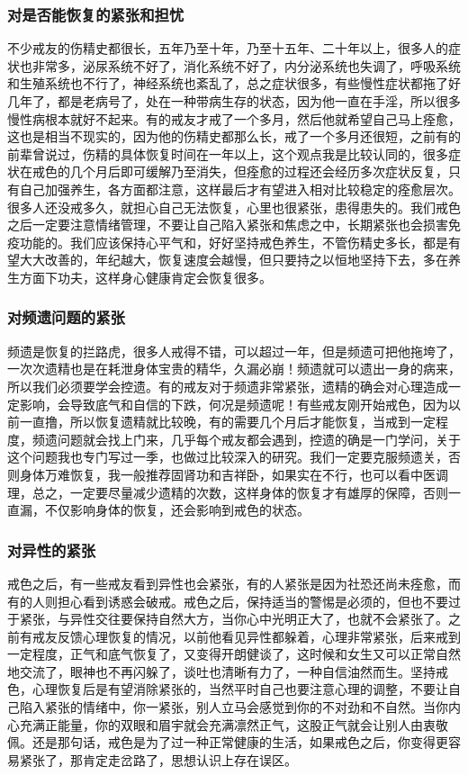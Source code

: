 \subsubsection{对是否能恢复的紧张和担忧}

不少戒友的伤精史都很长，五年乃至十年，乃至十五年、二十年以上，很多人的症状也非常多，泌尿系统不好了，消化系统不好了，内分泌系统也失调了，呼吸系统和生殖系统也不行了，神经系统也紊乱了，总之症状很多，有些慢性症状都拖了好几年了，都是老病号了，处在一种带病生存的状态，因为他一直在手淫，所以很多慢性病根本就好不起来。有的戒友才戒了一个多月，然后他就希望自己马上痊愈，这也是相当不现实的，因为他的伤精史都那么长，戒了一个多月还很短，之前有的前辈曾说过，伤精的具体恢复时间在一年以上，这个观点我是比较认同的，很多症状在戒色的几个月后即可缓解乃至消失，但痊愈的过程还会经历多次症状反复，只有自己加强养生，各方面都注意，这样最后才有望进入相对比较稳定的痊愈层次。很多人还没戒多久，就担心自己无法恢复，心里也很紧张，患得患失的。我们戒色之后一定要注意情绪管理，不要让自己陷入紧张和焦虑之中，长期紧张也会损害免疫功能的。我们应该保持心平气和，好好坚持戒色养生，不管伤精史多长，都是有望大大改善的，年纪越大，恢复速度会越慢，但只要持之以恒地坚持下去，多在养生方面下功夫，这样身心健康肯定会恢复很多。

\subsubsection{对频遗问题的紧张}

频遗是恢复的拦路虎，很多人戒得不错，可以超过一年，但是频遗可把他拖垮了，一次次遗精也是在耗泄身体宝贵的精华，久漏必崩！频遗就可以遗出一身的病来，所以我们必须要学会控遗。有的戒友对于频遗非常紧张，遗精的确会对心理造成一定影响，会导致底气和自信的下跌，何况是频遗呢！有些戒友刚开始戒色，因为以前一直撸，所以恢复遗精就比较晚，有的需要几个月后才能恢复，当戒到一定程度，频遗问题就会找上门来，几乎每个戒友都会遇到，控遗的确是一门学问，关于这个问题我也专门写过一季，也做过比较深入的研究。我们一定要克服频遗关，否则身体万难恢复，我一般推荐固肾功和吉祥卧，如果实在不行，也可以看中医调理，总之，一定要尽量减少遗精的次数，这样身体的恢复才有雄厚的保障，否则一直漏，不仅影响身体的恢复，还会影响到戒色的状态。

\subsubsection{对异性的紧张}

戒色之后，有一些戒友看到异性也会紧张，有的人紧张是因为社恐还尚未痊愈，而有的人则担心看到诱惑会破戒。戒色之后，保持适当的警惕是必须的，但也不要过于紧张，与异性交往要保持自然大方，当你心中光明正大了，也就不会紧张了。之前有戒友反馈心理恢复的情况，以前他看见异性都躲着，心理非常紧张，后来戒到一定程度，正气和底气恢复了，又变得开朗健谈了，这时候和女生又可以正常自然地交流了，眼神也不再闪躲了，谈吐也清晰有力了，一种自信油然而生。坚持戒色，心理恢复后是有望消除紧张的，当然平时自己也要注意心理的调整，不要让自己陷入紧张的情绪中，你一紧张，别人立马会感觉到你的不对劲和不自然。当你内心充满正能量，你的双眼和眉宇就会充满凛然正气，这股正气就会让别人由衷敬佩。还是那句话，戒色是为了过一种正常健康的生活，如果戒色之后，你变得更容易紧张了，那肯定走岔路了，思想认识上存在误区。

